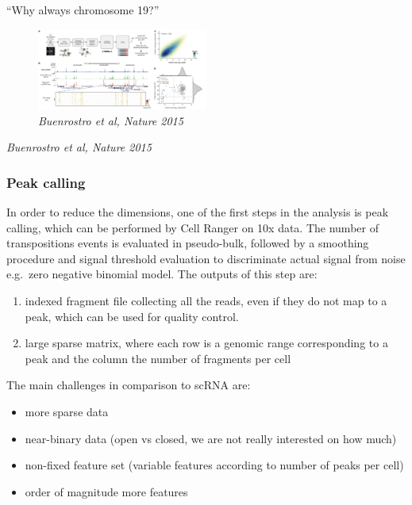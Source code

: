 ``Why always chromosome 19?''

\begin{figure}
\centering
\includegraphics[width=0.5\textwidth]{images/Screenshot_8.png}
\caption{\emph{Buenrostro et al, Nature 2015}}
\end{figure}

\emph{Buenrostro et al, Nature 2015}

\hypertarget{peak-calling}{%
\subsubsection{Peak calling}\label{peak-calling}}

In order to reduce the dimensions, one of the first steps in the
analysis is peak calling, which can be performed by Cell Ranger on 10x
data. The number of transpositions events is evaluated in pseudo-bulk,
followed by a smoothing procedure and signal threshold evaluation to
discriminate actual signal from noise e.g.~zero negative binomial model.
The outputs of this step are:

\begin{enumerate}
\def\labelenumi{\arabic{enumi}.}
\tightlist
\item
  indexed fragment file collecting all the reads, even if they do not
  map to a peak, which can be used for quality control.
\item
  large sparse matrix, where each row is a genomic range corresponding
  to a peak and the column the number of fragments per cell
\end{enumerate}

The main challenges in comparison to scRNA are:

\begin{itemize}
\tightlist
\item
  more sparse data
\item
  near-binary data (open vs closed, we are not really interested on how
  much)
\item
  non-fixed feature set (variable features according to number of peaks
  per cell)
\item
  order of magnitude more features
\end{itemize}


